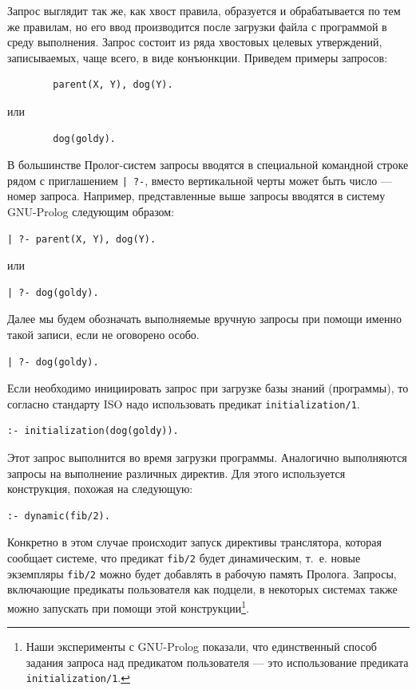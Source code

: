 \documentclass[12pt, openany, twoside]{book} %
\begin{document}
Запрос выглядит так же, как хвост правила, образуется и обрабатывается по тем же правилам, но его ввод производится после загрузки файла с программой в среду выполнения. Запрос состоит из ряда хвостовых целевых утверждений, записываемых, чаще всего, в виде конъюнкции. Приведем примеры запросов:
{\tt\begin{verbatim}
        parent(X, Y), dog(Y).
\end{verbatim}}
\noindent или
{\tt\begin{verbatim}
        dog(goldy).
\end{verbatim}}
В большинстве Пролог-систем запросы вводятся в специальной командной строке рядом с приглашением \texttt{| ?-}, вместо вертикальной черты может быть число --- номер запроса. Например, представленные выше запросы вводятся в систему GNU-Prolog следующим образом:
{\tt\begin{verbatim}
| ?- parent(X, Y), dog(Y).
\end{verbatim}}
\noindent или
{\tt\begin{verbatim}
| ?- dog(goldy).
\end{verbatim}}
\noindent{}Далее мы будем обозначать выполняемые вручную запросы при помощи именно такой записи, если не оговорено особо.
{\tt\begin{verbatim}
| ?- dog(goldy).
\end{verbatim}}

Если необходимо инициировать запрос при загрузке базы знаний (программы), то согласно стандарту ISO надо использовать предикат \texttt{initialization/1}.
{\tt\begin{verbatim}
:- initialization(dog(goldy)).
\end{verbatim}}
Этот запрос выполнится во время загрузки программы. Аналогично выполняются запросы на выполнение различных директив. Для этого используется конструкция, похожая на следующую:
{\tt\begin{verbatim}
:- dynamic(fib/2).
\end{verbatim}}
Конкретно в этом случае происходит запуск директивы транслятора, которая сообщает системе, что предикат \texttt{fib/2} будет динамическим, т.~е. новые экземпляры \texttt{fib/2} можно будет добавлять в рабочую память Пролога. Запросы, включающие предикаты пользователя как подцели, в некоторых системах также можно запускать при помощи этой конструкции\footnote{Наши эксперименты с GNU-Prolog показали, что единственный способ задания запроса над предикатом пользователя --- это использование предиката \texttt{initialization/1}.}.
\end{document}
